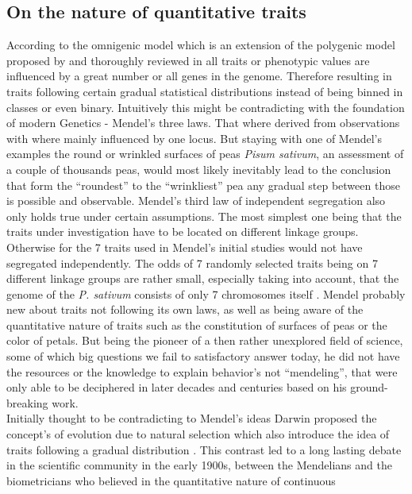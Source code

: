 \subsection{On the nature of quantitative traits} \label{quan} According to the omnigenic model which is an
extension of the polygenic model proposed by \cite{boyle2017expanded} and thoroughly reviewed in
\cite{timpson2018} all traits or phenotypic values are influenced by a great number or all genes in the
genome. Therefore resulting in traits following certain gradual statistical distributions instead of being
binned in classes or even binary. Intuitively this might be contradicting with the foundation of modern
Genetics - Mendel's three laws. That where derived from observations with where mainly influenced by one
locus. But staying with one of Mendel's examples the round or wrinkled surfaces of peas \textit{Pisum
  sativum}, an assessment of a couple of thousands peas, would most likely inevitably lead to the conclusion
that form the ``roundest'' to the ``wrinkliest'' pea any gradual step between those is possible and
observable. Mendel's third law of independent segregation also only holds true under certain assumptions. The
most simplest one being that the traits under investigation have to be located on different linkage
groups. Otherwise for the 7 traits used in Mendel's initial studies would not have segregated
independently. The odds of 7 randomly selected traits being on 7 different linkage groups are rather small,
especially taking into account, that the genome of the \textit{P. sativum} consists of only 7 chromosomes
itself \cite{kalo2004}. Mendel probably new about traits not following its own laws, as well as being aware of
the quantitative nature of traits such as the constitution of surfaces of peas or the color of petals. But
being the pioneer of a then rather unexplored field of science, some of which big questions we fail to
satisfactory answer today, he did not have the resources or the knowledge to explain behavior's not
``mendeling'', that were only able to be deciphered in later decades and centuries
based on his ground-breaking work. \\
Initially thought to be contradicting to Mendel's ideas Darwin proposed the concept's of evolution due to
natural selection which also introduce the idea of traits following a gradual distribution
\cite{darwin1859}. This contrast led to a long lasting debate in the scientific community in the early 1900s,
between the Mendelians and the biometricians who believed in the quantitative nature of continuous
